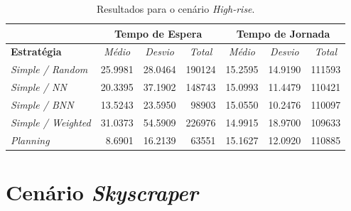 \begin{table}[htb!]
\centering
\caption{Resultados para o cenário \textit{High-rise}.}
\label{tab:results:highrise}
\begin{tabular}{|l|r|r|r|r|r|r|}
\hline
\multicolumn{1}{|c|}{\textbf{}}                 & \multicolumn{3}{c|}{\textbf{Tempo de Espera}}                                                                    & \multicolumn{3}{c|}{\textbf{Tempo de Jornada}}                                                                                                                       \\ \hline
\textbf{Estratégia} & \multicolumn{1}{c|}{\textit{Médio}} & \multicolumn{1}{c|}{\textit{Desvio}} & \multicolumn{1}{c|}{\textit{Total}} & \multicolumn{1}{c|}{\textit{Médio}}                   & \multicolumn{1}{c|}{\textit{Desvio}}                  & \multicolumn{1}{c|}{\textit{Total}}                  \\ \hline
\textit{Simple / Random}          & 25.9981 & 28.0464 & 190124 & 15.2595 & 14.9190 & 111593 \\ \hline
\textit{Simple / NN}              & 20.3395 & 37.1902 & 148743 & 15.0993 & 11.4479 & 110421 \\ \hline
\textit{Simple / BNN}             & 13.5243 & 23.5950 &  98903 & 15.0550 & \cellcolor[HTML]{67FD9A}10.2476 & 110097 \\ \hline
\textit{Simple / Weighted}        & 31.0373 & 54.5909 & 226976 & \cellcolor[HTML]{67FD9A}14.9915 & 18.9700 & \cellcolor[HTML]{67FD9A}109633 \\ \hline
\textit{Planning}                 &  \cellcolor[HTML]{67FD9A}8.6901 & \cellcolor[HTML]{67FD9A}16.2139 &  \cellcolor[HTML]{67FD9A}63551 & 15.1627 & 12.0920 & 110885 \\ \hline
\end{tabular}
\end{table}

\section{Cenário \textit{Skyscraper}}

\lipsum[1]


